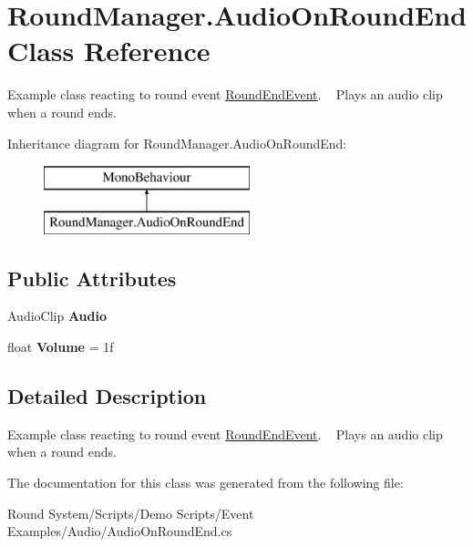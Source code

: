\hypertarget{class_round_manager_1_1_audio_on_round_end}{}\section{Round\+Manager.\+Audio\+On\+Round\+End Class Reference}
\label{class_round_manager_1_1_audio_on_round_end}


Example class reacting to round event \hyperlink{class_round_manager_1_1_events_1_1_round_end_event}{Round\+End\+Event}. ~\newline
Plays an audio clip when a round ends.  


Inheritance diagram for Round\+Manager.\+Audio\+On\+Round\+End\+:\begin{figure}[H]
\begin{center}
\leavevmode
\includegraphics[height=2.000000cm]{class_round_manager_1_1_audio_on_round_end}
\end{center}
\end{figure}
\subsection*{Public Attributes}
\begin{DoxyCompactItemize}
\item 
\hypertarget{class_round_manager_1_1_audio_on_round_end_a54ce36fa8e65d63d67052c1bb6215e47}{}Audio\+Clip {\bfseries Audio}\label{class_round_manager_1_1_audio_on_round_end_a54ce36fa8e65d63d67052c1bb6215e47}

\item 
\hypertarget{class_round_manager_1_1_audio_on_round_end_aba9ebec253b4e60013b4a6cadcf239b2}{}float {\bfseries Volume} = 1f\label{class_round_manager_1_1_audio_on_round_end_aba9ebec253b4e60013b4a6cadcf239b2}

\end{DoxyCompactItemize}


\subsection{Detailed Description}
Example class reacting to round event \hyperlink{class_round_manager_1_1_events_1_1_round_end_event}{Round\+End\+Event}. ~\newline
Plays an audio clip when a round ends. 



The documentation for this class was generated from the following file\+:\begin{DoxyCompactItemize}
\item 
Round System/\+Scripts/\+Demo Scripts/\+Event Examples/\+Audio/Audio\+On\+Round\+End.\+cs\end{DoxyCompactItemize}
